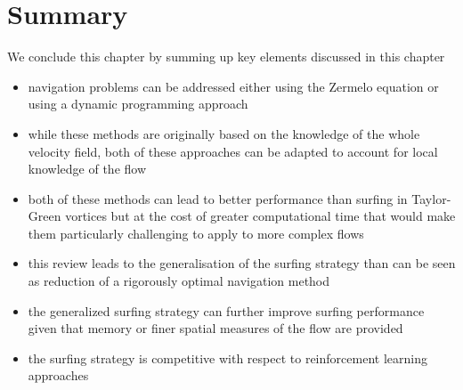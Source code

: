 \section{Summary}

We conclude this chapter by summing up key elements discussed in this chapter
\begin{itemize}
	\item navigation problems can be addressed either using the Zermelo equation or using a dynamic programming approach
	\item while these methods are originally based on the knowledge of the whole velocity field, both of these approaches can be adapted to account for local knowledge of the flow
	\item both of these methods can lead to better performance than surfing in Taylor-Green vortices but at the cost of greater computational time that would make them particularly challenging to apply to more complex flows
	\item this review leads to the generalisation of the surfing strategy than can be seen as reduction of a rigorously optimal navigation method 
	\item the generalized surfing strategy can further improve surfing performance given that memory or finer spatial measures of the flow are provided
	\item the surfing strategy is competitive with respect to reinforcement learning approaches
\end{itemize}
